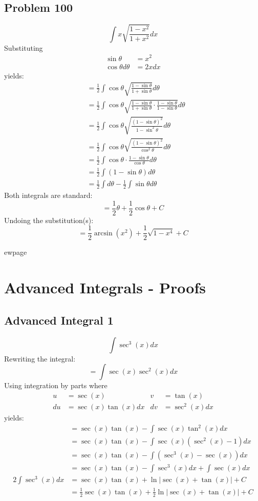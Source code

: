 \documentclass{article}
\begin{document}
\subsection*{Problem 100}
$$\int x\sqrt{\frac{1-x^2}{1+x^2}}dx$$
Substituting
\begin{align*}
\sin\theta&=x^2 \\
\cos\theta d\theta&=2xdx
\end{align*}
yields:
\begin{align*}
&=\frac{1}{2}\int\cos\theta\sqrt{\frac{1-\sin\theta}{1+\sin\theta}}d\theta \\
&=\frac{1}{2}\int\cos\theta\sqrt{\frac{1-\sin\theta}{1+\sin\theta}\cdot\frac{1-\sin\theta}{1-\sin\theta}}d\theta \\
&=\frac{1}{2}\int\cos\theta\sqrt{\frac{(1-\sin\theta)^2}{1-\sin^2\theta}}d\theta \\
&=\frac{1}{2}\int\cos\theta\sqrt{\frac{(1-\sin\theta)^2}{\cos^2\theta}}d\theta \\
&=\frac{1}{2}\int\cos\theta\cdot\frac{1-\sin\theta}{\cos\theta}d\theta \\
&=\frac{1}{2}\int(1-\sin\theta)d\theta \\
&=\frac{1}{2}\int d\theta-\frac{1}{2}\int\sin\theta d\theta
\end{align*}
Both integrals are standard:
$$=\frac{1}{2}\theta+\frac{1}{2}\cos\theta+C$$
Undoing the substitution(s):
$$=\frac{1}{2}\arcsin\left(x^2\right)+\frac{1}{2}\sqrt{1-x^4}+C$$

ewpage
\section{Advanced Integrals - Proofs}
\subsection*{Advanced Integral 1}
$$\int\sec^3(x)dx$$
Rewriting the integral:
$$=\int\sec(x)\sec^2(x)dx$$
Using integration by parts where
\begin{align*}
u&=\sec(x) &v&=\tan(x) \\
du&=\sec(x)\tan(x)dx &dv&=\sec^2(x)dx
\end{align*}
yields:
\begin{align*}
&=\sec(x)\tan(x)-\int\sec(x)\tan^2(x)dx \\
&=\sec(x)\tan(x)-\int\sec(x)(\sec^2(x)-1)dx \\
&=\sec(x)\tan(x)-\int(\sec^3(x)-\sec(x))dx \\
&=\sec(x)\tan(x)-\int\sec^3(x)dx+\int\sec(x)dx \\
2\int\sec^3(x)dx&=\sec(x)\tan(x)+\ln\left|\sec(x)+\tan(x)\right|+C \\
&=\frac{1}{2}\sec(x)\tan(x)+\frac{1}{2}\ln\left|\sec(x)+\tan(x)\right|+C
\end{align*}
\end{document}
